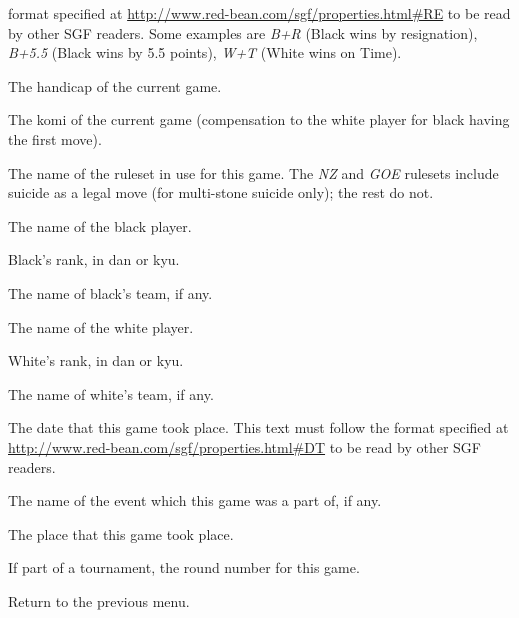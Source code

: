 \begin {description}
\begin{description}
            format specified at \url{http://www.red-bean.com/sgf/properties.html#RE}
            to be read by other SGF readers.  Some examples are
            \emph {B+R} (Black wins by resignation),
            \emph {B+5.5} (Black wins by 5.5 points),
            \emph {W+T} (White wins on Time).
        \item[Handicap.] The handicap of the current game.
        \item[Komi.] The komi of the current game (compensation to the white
            player for black having the first move).
        \item[Ruleset.] The name of the ruleset in use for this game.
            The \emph{NZ} and \emph{GOE} rulesets include suicide as a legal
            move (for multi-stone suicide only); the rest do not.
        \item[Black Player.] The name of the black player.
        \item[Black Rank.] Black's rank, in dan or kyu.
        \item[Black Team.] The name of black's team, if any.
        \item[White Player.] The name of the white player.
        \item[White Rank.]  White's rank, in dan or kyu.
        \item[White Team.] The name of white's team, if any.
        \item[Date.] The date that this game took place. This text must follow
            the format specified at \url{http://www.red-bean.com/sgf/properties.html#DT}
            to be read by other SGF readers.
        \item[Event.] The name of the event which this game was a part of, if any.
        \item[Place.] The place that this game took place.
        \item[Round.] If part of a tournament, the round number for this game.
        \item[Done.] Return to the previous menu.
    \end{description}


\end{description}
